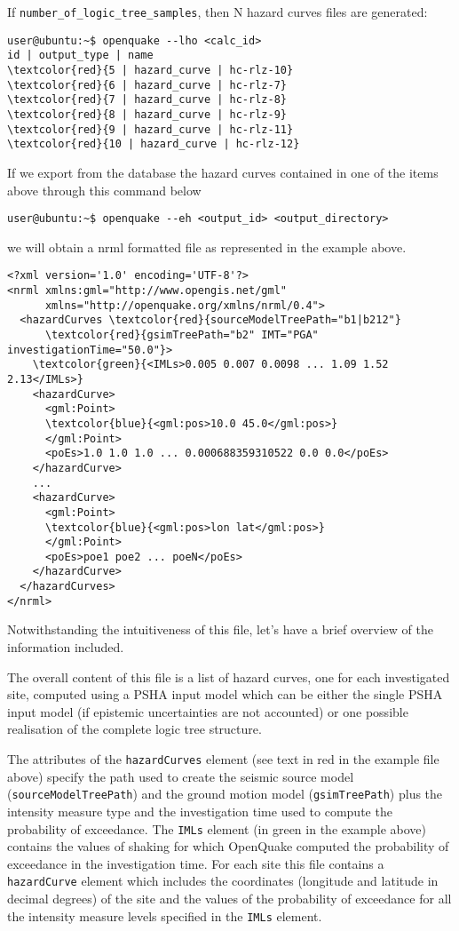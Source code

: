 If \texttt{number\_of\_logic\_tree\_samples}, then N hazard curves 
files are generated:
\begin{Verbatim}[frame=single, commandchars=\\\{\}, fontsize=\small]
user@ubuntu:~$ openquake --lho <calc_id>
id | output_type | name
\textcolor{red}{5 | hazard_curve | hc-rlz-10}
\textcolor{red}{6 | hazard_curve | hc-rlz-7}
\textcolor{red}{7 | hazard_curve | hc-rlz-8}
\textcolor{red}{8 | hazard_curve | hc-rlz-9}
\textcolor{red}{9 | hazard_curve | hc-rlz-11}
\textcolor{red}{10 | hazard_curve | hc-rlz-12}
\end{Verbatim}
If we export from the database the hazard curves contained in 
one of the items above through this command below
\begin{Verbatim}[frame=single, commandchars=\\\{\}, fontsize=\small]
user@ubuntu:~$ openquake --eh <output_id> <output_directory>
\end{Verbatim}
we will obtain a nrml formatted file as represented in the example
above.
\begin{Verbatim}[frame=single, commandchars=\\\{\}, fontsize=\small]
<?xml version='1.0' encoding='UTF-8'?>
<nrml xmlns:gml="http://www.opengis.net/gml" 
      xmlns="http://openquake.org/xmlns/nrml/0.4">
  <hazardCurves \textcolor{red}{sourceModelTreePath="b1|b212"} 
      \textcolor{red}{gsimTreePath="b2" IMT="PGA" investigationTime="50.0"}>
    \textcolor{green}{<IMLs>0.005 0.007 0.0098 ... 1.09 1.52 2.13</IMLs>}
    <hazardCurve>
      <gml:Point>
      \textcolor{blue}{<gml:pos>10.0 45.0</gml:pos>}
      </gml:Point>
      <poEs>1.0 1.0 1.0 ... 0.000688359310522 0.0 0.0</poEs>
    </hazardCurve>
    ...
    <hazardCurve>
      <gml:Point>
      \textcolor{blue}{<gml:pos>lon lat</gml:pos>}
      </gml:Point>
      <poEs>poe1 poe2 ... poeN</poEs>
    </hazardCurve>
  </hazardCurves>
</nrml>
\end{Verbatim}
Notwithstanding the intuitiveness of this file, let's have a brief 
overview of the information included.

The overall content of this file is a list of hazard curves, one for
each investigated site, computed using a PSHA input model which 
can be either the single PSHA input model (if epistemic 
uncertainties are not accounted) or one possible realisation of 
the complete logic tree structure. 

The attributes of the \texttt{hazardCurves} element (see text in 
red in the example file above) specify the path used to create the 
seismic source model (\texttt{source\-Model\-TreePath}) and the ground
motion model (\texttt{gsim\-Tree\-Path}) plus the intensity measure type 
and the investigation time used to compute the probability of exceedance. 
The \texttt{IMLs} element (in green in the example above) contains the 
values of shaking for which OpenQuake computed the probability of 
exceedance in the investigation time.
For each site this file contains a \texttt{hazardCurve} element which 
includes the coordinates (longitude and latitude in decimal degrees) 
of the site and the values of the probability of exceedance for all the 
intensity measure levels specified in the \texttt{IMLs} element.

